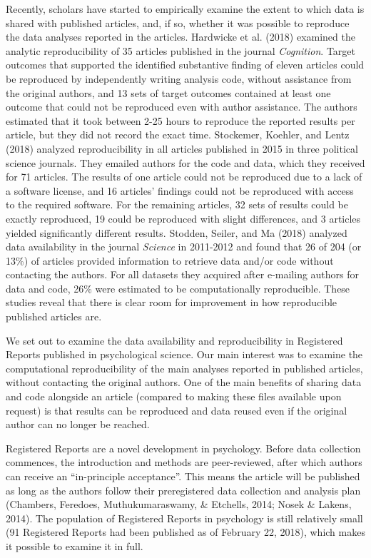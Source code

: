 \documentclass[
  ,jou, a4paper,floatsintext]{apa6}
\begin{document}
Recently, scholars have started to empirically examine the extent to which data is shared with published articles, and, if so, whether it was possible to reproduce the data analyses reported in the articles. Hardwicke et al. (2018) examined the analytic reproducibility of 35 articles published in the journal \emph{Cognition}. Target outcomes that supported the identified substantive finding of eleven articles could be reproduced by independently writing analysis code, without assistance from the original authors, and 13 sets of target outcomes contained at least one outcome that could not be reproduced even with author assistance. The authors estimated that it took between 2-25 hours to reproduce the reported results per article, but they did not record the exact time. Stockemer, Koehler, and Lentz (2018) analyzed reproducibility in all articles published in 2015 in three political science journals. They emailed authors for the code and data, which they received for 71 articles. The results of one article could not be reproduced due to a lack of a software license, and 16 articles' findings could not be reproduced with access to the required software. For the remaining articles, 32 sets of results could be exactly reproduced, 19 could be reproduced with slight differences, and 3 articles yielded significantly different results. Stodden, Seiler, and Ma (2018) analyzed data availability in the journal \emph{Science} in 2011-2012 and found that 26 of 204 (or 13\%) of articles provided information to retrieve data and/or code without contacting the authors. For all datasets they acquired after e-mailing authors for data and code, 26\% were estimated to be computationally reproducible. These studies reveal that there is clear room for improvement in how reproducible published articles are.

We set out to examine the data availability and reproducibility in Registered Reports published in psychological science. Our main interest was to examine the computational reproducibility of the main analyses reported in published articles, without contacting the original authors. One of the main benefits of sharing data and code alongside an article (compared to making these files available upon request) is that results can be reproduced and data reused even if the original author can no longer be reached.

Registered Reports are a novel development in psychology. Before data collection commences, the introduction and methods are peer-reviewed, after which authors can receive an \enquote{in-principle acceptance}. This means the article will be published as long as the authors follow their preregistered data collection and analysis plan (Chambers, Feredoes, Muthukumaraswamy, \& Etchells, 2014; Nosek \& Lakens, 2014). The population of Registered Reports in psychology is still relatively small (91 Registered Reports had been published as of February 22, 2018), which makes it possible to examine it in full.
\end{document}
